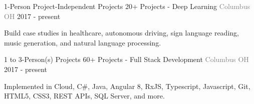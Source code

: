 \begin{cventries}
    \vspace{-2mm}  \cventry
    {1-Person Project-Independent Projects}
    {\hspace*{0.5mm}\bullet \hspace*{0.5mm} 20+ Projects - Deep Learning}
    {\textcolor{graytext}{Columbus OH}}
    {2017 - present}
    {
      \begin{cvitems}
        \item {Build case studies in healthcare, autonomous driving, sign language reading, music generation, and natural language processing.}      
      \end{cvitems}   \vspace{-2mm} 
    }   \cventry
    {1 to 3-Person(s) Projects}
    {\hspace*{0.5mm}\bullet \hspace*{0.5mm} 60+ Projects - Full Stack Development}
    {\textcolor{graytext}{Columbus OH}}
    {2017 - present}
    {
      \begin{cvitems}
        \item {Implemented in Cloud, C\#, Java, Angular 8, RxJS, Typescript, Javascript, Git, HTML5, CSS3, REST APIs, SQL Server, and more.}    
      \end{cvitems}   \vspace{-2mm} 
    } 
\end{cventries}
